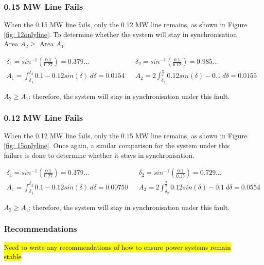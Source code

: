         \subsubsection*{0.15 MW Line Fails}
            When the 0.15 MW line fails, only the 0.12 MW line remains, as shown in Figure \ref{fig: 12onlyline}. To determine whether the system will stay in synchronisation Area \(A_2 \geq\) Area \(A_1\). 
    
            \begin{align}
                \delta_1 = sin^{-1}\left(\frac{0.1}{0.27}\right) = 0.379... && \delta_2 = sin^{-1}\left(\frac{0.1}{0.12}\right) = 0.985...\\
                A_1 = \int_{\delta_1}^{\delta_2}{0.1 - 0.12sin(\delta) \: d\delta} = 0.0154 && A_2 = 2\int_{\delta_2}^{\frac{\pi}{2}}{0.12sin(\delta) - 0.1 \: d\delta} = 0.0155
            \end{align}

            \(A_2 \geq A_1\); therefore, the system will stay in synchronisation under this fault.

        \subsubsection*{0.12 MW Line Fails}
            When the 0.12 MW line fails, only the 0.15 MW line remains, as shown in Figure \ref{fig: 15onlyline}. Once again, a similar comparison for the system under this failure is done to determine whether it stays in synchronisation. 
    
            \begin{align}
                \delta_1 = sin^{-1}\left(\frac{0.1}{0.27}\right) = 0.379... && \delta_2 = sin^{-1}\left(\frac{0.1}{0.15}\right) = 0.729...\\
                A_1 = \int_{\delta_1}^{\delta_2}{0.1 - 0.12sin(\delta) \: d\delta} = 0.00750 && A_2 = 2\int_{\delta_2}^{\frac{\pi}{2}}{0.12sin(\delta) - 0.1 \: d\delta} = 0.0554
            \end{align}

            \(A_2 \geq A_1\); therefore, the system will stay in synchronisation under this fault.

        \subsubsection*{Recommendations}
            \hl{Need to write any recommendations of how to ensure power systems remain stable}

